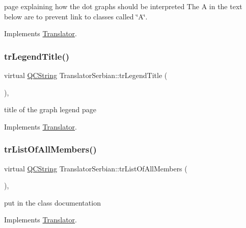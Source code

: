 page explaining how the dot graph\textquotesingle{}s should be interpreted The A in the text below are to prevent link to classes called \char`\"{}\+A\char`\"{}. 

Implements \mbox{\hyperlink{class_translator}{Translator}}.

\mbox{\label{class_translator_serbian_a783408f55230a0502bb8bfdd13d193ad}} 
\subsubsection{\texorpdfstring{trLegendTitle()}{trLegendTitle()}}
{\footnotesize\ttfamily virtual \mbox{\hyperlink{class_q_c_string}{Q\+C\+String}} Translator\+Serbian\+::tr\+Legend\+Title (\begin{DoxyParamCaption}{ }\end{DoxyParamCaption})\hspace{0.3cm}{\ttfamily [inline]}, {\ttfamily [virtual]}}

title of the graph legend page 

Implements \mbox{\hyperlink{class_translator}{Translator}}.

\mbox{\label{class_translator_serbian_a1f9399cf2a19ce600af9d3ed0324cd70}} 
\subsubsection{\texorpdfstring{trListOfAllMembers()}{trListOfAllMembers()}}
{\footnotesize\ttfamily virtual \mbox{\hyperlink{class_q_c_string}{Q\+C\+String}} Translator\+Serbian\+::tr\+List\+Of\+All\+Members (\begin{DoxyParamCaption}{ }\end{DoxyParamCaption})\hspace{0.3cm}{\ttfamily [inline]}, {\ttfamily [virtual]}}

put in the class documentation 

Implements \mbox{\hyperlink{class_translator}{Translator}}.

\mbox{\label{class_translator_serbian_ab853a7762887e5ff90896e45c31f38c2}} 
